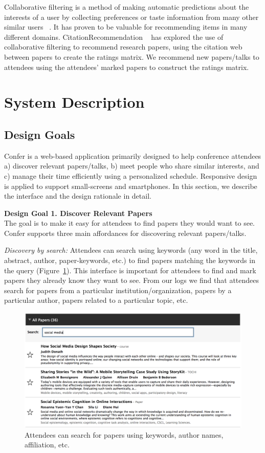 \documentclass{sigchi}
\begin{document}
Collaborative filtering is a method of making automatic predictions about the interests of a user by collecting preferences or taste information from many other similar users ~\cite{CollaborativeFiltering}. It has proven to be valuable for recommending items in many different domains. CitationRecommendation ~\cite{CitationRecommendation} has explored the use of collaborative filtering to recommend research papers, using the citation web between papers to create the ratings matrix. We recommend new papers/talks to attendees using the attendees' marked papers to construct the ratings matrix.


\section{System Description}
\subsection{Design Goals}
Confer is a web-based application primarily designed to help conference attendees a) discover relevant papers/talks, b) meet people who share similar interests, and c) manage their time efficiently using a personalized schedule. Responsive design is applied to support small-screens and smartphones. In this section, we describe the interface and the design rationale in detail.


\textbf{Design Goal 1. Discover Relevant Papers}\\
The goal is to make it easy for attendees to find papers they would want to see. Confer supports three main affordances for discovering relevant papers/talks.

\emph{Discovery by search:} Attendees can search using keywords (any word in the title, abstract, author, paper-keywords, etc.) to find papers matching the keywords in the query (Figure~\ref{confer-search}). This interface is important for attendees to find and mark papers they already know they want to see. From our logs we find that attendees search for papers from a particular institution/organization, papers by a particular author, papers related to a particular topic, etc. 

\begin{figure}[!h]
\centering
\includegraphics[width=0.95\columnwidth]{confer-search.png}
\caption{Attendees can search for papers using keywords, author names, affiliation, etc.}
\label{confer-search}
\end{figure}
\end{document}
